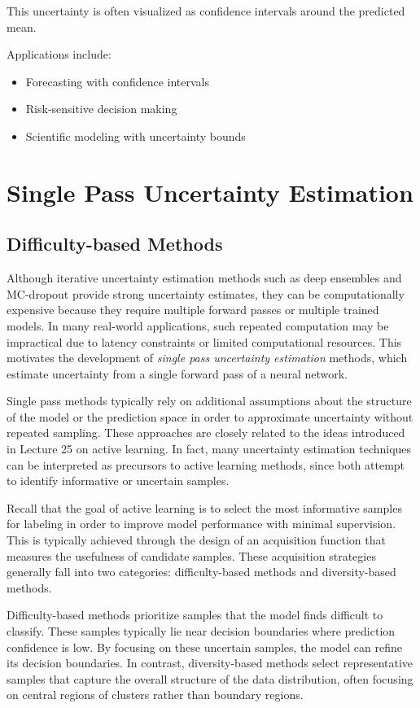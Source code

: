 \documentclass{article}
\begin{document}
This uncertainty is often visualized as confidence intervals around the predicted mean.

Applications include:
\begin{itemize}
\item Forecasting with confidence intervals
\item Risk-sensitive decision making
\item Scientific modeling with uncertainty bounds
\end{itemize}

\section{Single Pass Uncertainty Estimation}

\subsection{Difficulty-based Methods}

Although iterative uncertainty estimation methods such as deep ensembles and MC-dropout provide strong uncertainty estimates, they can be computationally expensive because they require multiple forward passes or multiple trained models. In many real-world applications, such repeated computation may be impractical due to latency constraints or limited computational resources. This motivates the development of \textit{single pass uncertainty estimation} methods, which estimate uncertainty from a single forward pass of a neural network.

Single pass methods typically rely on additional assumptions about the structure of the model or the prediction space in order to approximate uncertainty without repeated sampling. These approaches are closely related to the ideas introduced in Lecture 25 on active learning. In fact, many uncertainty estimation techniques can be interpreted as precursors to active learning methods, since both attempt to identify informative or uncertain samples.

Recall that the goal of active learning is to select the most informative samples for labeling in order to improve model performance with minimal supervision. This is typically achieved through the design of an acquisition function that measures the usefulness of candidate samples. These acquisition strategies generally fall into two categories: difficulty-based methods and diversity-based methods.

Difficulty-based methods prioritize samples that the model finds difficult to classify. These samples typically lie near decision boundaries where prediction confidence is low. By focusing on these uncertain samples, the model can refine its decision boundaries. In contrast, diversity-based methods select representative samples that capture the overall structure of the data distribution, often focusing on central regions of clusters rather than boundary regions.
\end{document}
